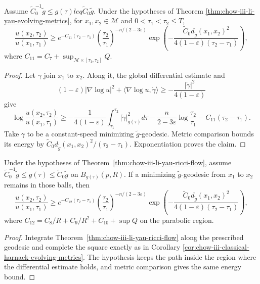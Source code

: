 \begin{corollary}
\label{cor:chow-iii-classical-harnack-evolving-metrics}
Assume \(\widetilde C_0^{-1}\widetilde g\leq g(\tau)leq
\widetilde C_0\widetilde g\).  Under the hypotheses of Theorem
\ref{thm:chow-iii-li-yau-evolving-metrics}, for
\(x_1,x_2\in\mathcal M\) and \(0<\tau_1<\tau_2\leq T\),
\[
 \frac{u(x_2,\tau_2)}{u(x_1,\tau_1)}
 \geq e^{-C_{11}(\tau_2-\tau_1)}
 \left(\frac{\tau_2}{\tau_1}\right)^{-n/(2-3\varepsilon)}
 \exp\left(-\frac{\widetilde C_0d_{\widetilde g}(x_1,x_2)^2}
 {4(1-\varepsilon)(\tau_2-\tau_1)}\right),
\]
where \(C_{11}=C_7+\sup_{\mathcal M\times[\tau_1,\tau_2]}Q\).
\end{corollary}
\begin{proof}
\sketch Let \(\gamma\) join \(x_1\) to \(x_2\).  Along it, the global differential
estimate and
\[
 (1-\varepsilon)|\nabla\log u|^2
 +\langle\nabla\log u,\dot\gamma\rangle
 \geq-\frac{|\dot\gamma|^2}{4(1-\varepsilon)}
\]
give
\[
 \log\frac{u(x_2,\tau_2)}{u(x_1,\tau_1)}
 \geq-\frac1{4(1-\varepsilon)}\int_{\tau_1}^{\tau_2}|\dot\gamma|_{g(\tau)}^2d\tau
 -\frac n{2-3\varepsilon}\log\frac{\tau_2}{\tau_1}
 -C_{11}(\tau_2-\tau_1).
\]
Take \(\gamma\) to be a constant-speed minimizing \(\widetilde g\)-geodesic.
Metric comparison bounds its energy by
\(\widetilde C_0d_{\widetilde g}(x_1,x_2)^2/(\tau_2-\tau_1)\).
Exponentiation proves the claim.
\end{proof}

\begin{corollary}
\label{cor:chow-iii-classical-harnack-ricci-flow}
Under the hypotheses of Theorem~\ref{thm:chow-iii-li-yau-ricci-flow}, assume
\(\widetilde C_0^{-1}\widetilde g\leq g(\tau)\leq
\widetilde C_0\widetilde g\) on \(B_{g(\tau)}(p,R)\).  If a minimizing
\(\widetilde g\)-geodesic from \(x_1\) to \(x_2\) remains in those balls,
then
\[
 \frac{u(x_2,\tau_2)}{u(x_1,\tau_1)}
 \geq e^{-C_{12}(\tau_2-\tau_1)}
 \left(\frac{\tau_2}{\tau_1}\right)^{-n/(2-3\varepsilon)}
 \exp\left(-\frac{\widetilde C_0d_{\widetilde g}(x_1,x_2)^2}
 {4(1-\varepsilon)(\tau_2-\tau_1)}\right),
\]
where
\(C_{12}=C_8/R+C_9/R^2+C_{10}+\sup Q\) on the parabolic region.
\end{corollary}
\begin{proof}
\sketch Integrate Theorem~\ref{thm:chow-iii-li-yau-ricci-flow} along the prescribed
geodesic and complete the square exactly as in Corollary
\ref{cor:chow-iii-classical-harnack-evolving-metrics}.  The hypothesis keeps
the path inside the region where the differential estimate holds, and metric
comparison gives the same energy bound.
\end{proof}

